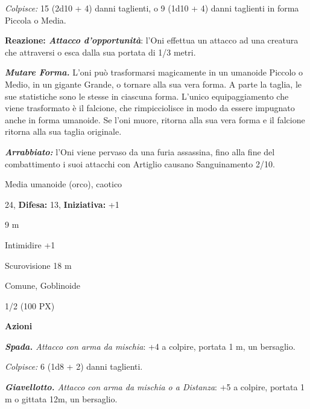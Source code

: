 \begin{multicols}{2}
{\emph{Colpisce:} 15 (2d10 + 4) danni taglienti, o 9 (1d10 + 4) danni taglienti in forma Piccola o Media.

\textbf{Reazione: \emph{Attacco d'opportunità}}: l'Oni effettua un attacco ad una creatura che attraversi o esca dalla sua portata di 1/3 metri.

\emph{\textbf{Mutare Forma.}} L'oni può trasformarsi magicamente in un umanoide Piccolo o Medio, in un gigante Grande, o tornare alla sua vera forma. A parte la taglia, le sue statistiche sono le stesse in ciascuna forma. L'unico equipaggiamento che viene trasformato è il falcione, che rimpicciolisce in modo da essere impugnato anche in forma umanoide. Se l'oni muore, ritorna alla sua vera forma e il falcione ritorna alla sua taglia originale.

\emph{\textbf{Arrabbiato:}} l'Oni viene pervaso da una furia assassina, fino alla fine del combattimento i suoi attacchi con Artiglio causano Sanguinamento 2/10.

\noindent
\begin{description}[noitemsep, topsep=0pt, parsep=0pt, partopsep=0pt, leftmargin=0cm, labelwidth=2.2cm]
	\item[\textbf{Taglia/Tipo:}] Media umanoide (orco), caotico
	\item[\textbf{Caratt.:}] 
	\item[\textbf{Punti Ferita:}] 24,  \textbf{Difesa:} 13,  \textbf{Iniziativa:} +1
	\item[\textbf{Movimento:}] 9 m
	\item[\textbf{Tiri Salvez.:}] 
	\item[\textbf{Comp.:}] Intimidire +1
	\item[\textbf{Sensi:}] Scurovisione 18 m
	\item[\textbf{Linguaggi:}] Comune, Goblinoide
	\item[\textbf{Sfida:}] 1/2 (100 PX)\smallskip
\end{description}

\textbf{Azioni}

\emph{\textbf{Spada.} Attacco con arma da mischia}: +4 a colpire, portata 1 m, un bersaglio.

\emph{Colpisce:} 6 (1d8 + 2) danni taglienti.

\emph{\textbf{Giavellotto.} Attacco con arma da mischia o a Distanza}: +5 a colpire, portata 1 m o gittata 12m, un bersaglio.

}
\end{multicols}
